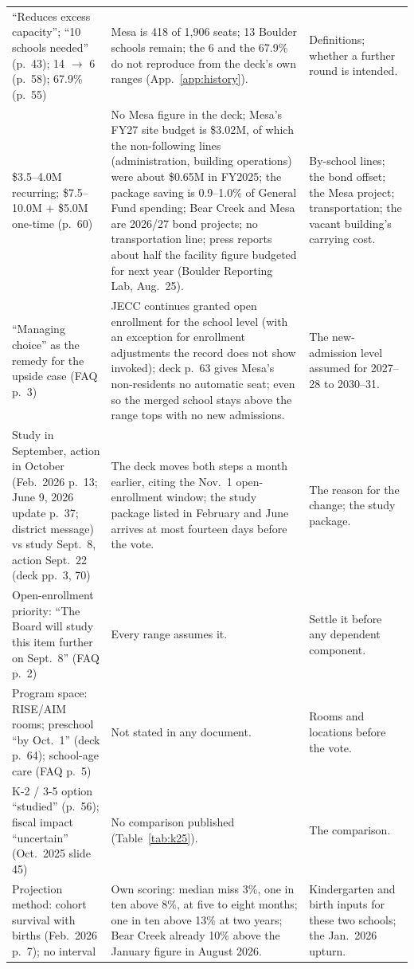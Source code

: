 \documentclass[11pt]{article}
\begin{document}
\begin{small}
\begin{longtable}{p{3.6cm}p{6.6cm}p{4.2cm}}
``Reduces excess capacity''; ``10 schools needed'' (p.\ 43); 14 $\to$ 6 (p.\ 58); 67.9\% (p.\ 55) & Mesa is 418 of 1,906 seats; 13 Boulder schools remain; the 6 and the 67.9\% do not reproduce from the deck's own ranges (App.~\ref{app:history}). & Definitions; whether a further round is intended. \\
\$3.5--4.0M recurring; \$7.5--10.0M $+$ \$5.0M one-time (p.\ 60) & No Mesa figure in the deck; Mesa's FY27 site budget is \$3.02M, of which the non-following lines (administration, building operations) were about \$0.65M in FY2025; the package saving is 0.9--1.0\% of General Fund spending; Bear Creek and Mesa are 2026/27 bond projects; no transportation line; press reports about half the facility figure budgeted for next year (Boulder Reporting Lab, Aug.\ 25). & By-school lines; the bond offset; the Mesa project; transportation; the vacant building's carrying cost. \\
``Managing choice'' as the remedy for the upside case (FAQ p.\ 3) & JECC continues granted open enrollment for the school level (with an exception for enrollment adjustments the record does not show invoked); deck p.\ 63 gives Mesa's non-residents no automatic seat; even so the merged school stays above the range tops with no new admissions. & The new-admission level assumed for 2027--28 to 2030--31. \\
Study in September, action in October (Feb.\ 2026 p.\ 13; June 9, 2026 update p.\ 37; district message) vs study Sept.\ 8, action Sept.\ 22 (deck pp.\ 3, 70) & The deck moves both steps a month earlier, citing the Nov.\ 1 open-enrollment window; the study package listed in February and June arrives at most fourteen days before the vote. & The reason for the change; the study package. \\
Open-enrollment priority: ``The Board will study this item further on Sept.\ 8'' (FAQ p.\ 2) & Every range assumes it. & Settle it before any dependent component. \\
Program space: RISE/AIM rooms; preschool ``by Oct.\ 1'' (deck p.\ 64); school-age care (FAQ p.\ 5) & Not stated in any document. & Rooms and locations before the vote. \\
K-2 / 3-5 option ``studied'' (p.\ 56); fiscal impact ``uncertain'' (Oct.\ 2025 slide 45) & No comparison published (Table~\ref{tab:k25}). & The comparison. \\
Projection method: cohort survival with births (Feb.\ 2026 p.\ 7); no interval & Own scoring: median miss 3\%, one in ten above 8\%, at five to eight months; one in ten above 13\% at two years; Bear Creek already 10\% above the January figure in August 2026. & Kindergarten and birth inputs for these two schools; the Jan.\ 2026 upturn. \\
\bottomrule
\end{longtable}
\end{small}
\end{document}

